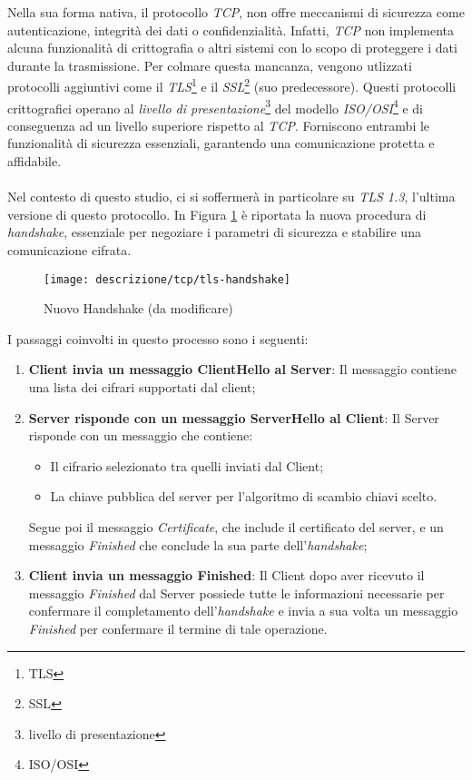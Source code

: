 \noindent Nella sua forma nativa, il protocollo \emph{TCP}, non offre meccanismi di sicurezza come autenticazione, integrità dei dati o confidenzialità. Infatti, \emph{TCP} non implementa alcuna funzionalità di crittografia o altri sistemi con lo scopo di proteggere i dati durante la trasmissione.
Per colmare questa mancanza, vengono utlizzati protocolli aggiuntivi come il \emph{TLS}\footnote{\gls{TLS}} e il \emph{SSL}\footnote{\gls{SSL}} (suo predecessore). Questi protocolli crittografici operano al \emph{livello di presentazione}\footnote{\gls{livello di presentazione}} del modello \emph{ISO/OSI}\footnote{\gls{ISO/OSI}} e di conseguenza ad un livello superiore rispetto al \emph{TCP}.
Forniscono entrambi le funzionalità di sicurezza essenziali, garantendo una comunicazione protetta e affidabile.
\\\\
Nel contesto di questo studio, ci si soffermerà in particolare su \emph{TLS 1.3}, l'ultima versione di questo protocollo. 
In Figura \ref{tlsHand} è riportata la nuova procedura di \emph{handshake}, essenziale per negoziare i parametri di sicurezza e stabilire una comunicazione cifrata.
\begin{figure}[!h]
    \centering
    \texttt{[image: descrizione/tcp/tls-handshake]}
    \caption{Nuovo Handshake (da modificare)}
    \label{tlsHand}
\end{figure}

\noindent I passaggi coinvolti in questo processo sono i seguenti: 
\begin{enumerate}
    \item \textbf{Client invia un messaggio ClientHello al Server}: Il messaggio contiene una lista dei cifrari supportati dal client;
    \item \textbf{Server risponde con un messaggio ServerHello al Client}: Il Server risponde con un messaggio che contiene: 
    \begin{itemize}
        \item  Il cifrario selezionato tra quelli inviati dal Client;
        \item  La chiave pubblica del server per l'algoritmo di scambio chiavi scelto.
    \end{itemize}
    Segue poi il messaggio \emph{Certificate}, che include il certificato del server, e un messaggio \emph{Finished} che conclude la sua parte dell'\emph{handshake};
    \item \textbf{Client invia un messaggio Finished}: Il Client dopo aver ricevuto il messaggio \emph{Finished} dal Server possiede tutte le informazioni necessarie per confermare il completamento dell'\emph{handshake} e invia a sua volta un messaggio \emph{Finished} per confermare il termine di tale operazione.
\end{enumerate}

